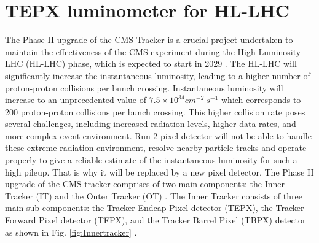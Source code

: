 \chapter{TEPX luminometer for HL-LHC}  %
\label{TEPX luminometer for HL-LHC}
  
\ifpdf
    \graphicspath{{Chapter7/Figs/Raster/}{Chapter7/Figs/PDF/}{Chapter7/Figs/}}
\else
    \graphicspath{{Chapter7/Figs/Vector/}{Chapter7/Figs/}}
\fi

The Phase II upgrade of the CMS Tracker is a crucial project undertaken to maintain the effectiveness of the CMS experiment during the High Luminosity LHC (HL-LHC) phase, which is expected to start in 2029 \cite{CERN2022}. The HL-LHC will significantly increase the instantaneous luminosity, leading to a higher number of proton-proton collisions per bunch crossing. Instantaneous luminosity will increase to an unprecedented value of $7.5 \times 10^{34} cm^{-2} \: s^{-1}$ which corresponds to 200 proton-proton collisions per bunch crossing. This higher collision rate poses several challenges, including increased radiation levels, higher data rates, and more complex event environment. Run 2 pixel detector will not be able to handle these extreme radiation environment, resolve nearby particle tracks and operate properly to give a reliable estimate of the instantaneous luminosity for such a high pileup. That is why it will be replaced by a new pixel detector. The Phase II upgrade of the CMS tracker comprises of two main components: the Inner Tracker (IT) and the Outer Tracker (OT) \cite{RoyChowdhury:2729279}. The Inner Tracker consists of three main sub-components: the Tracker Endcap Pixel detector (TEPX), the Tracker Forward Pixel detector (TFPX), and the Tracker Barrel Pixel (TBPX) detector as shown in Fig. \ref{fig:Innertracker} \cite{CERN-LHCC-2017-009}.  %

